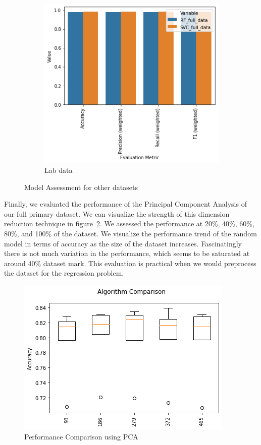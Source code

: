 \documentclass[a4paper,singleside,12pt]{report} %
\begin{document}
\begin{figure}[!htb]
\begin{subfigure}[b]{0.48\linewidth}
			    \includegraphics[width=\linewidth]{./figures/final_results_comparison_lab.png}
			    \caption{Lab data}
			  \end{subfigure}
			  \caption{Model Assessment for other datasets}
			  \label{fig5.8}
			\end{figure}
			
			
			Finally, we evaluated the performance of the Principal Component Analysis of our full primary dataset. 
			We can visualize the strength of this dimension reduction technique in figure~\ref{fig5.9}. 
			We assessed the performance at 20\%, 40\%, 60\%, 80\%, and 100\% of the dataset.  
			We visualize the performance trend of the random model in terms of accuracy as the size of the dataset increases.
			Fascinatingly there is not much variation in the performance, which seems to be saturated at around 40\% dataset mark. This evaluation is practical when we would preprocess the dataset for the regression problem. 
			
			
			\begin{figure}[!htb]
				\centering
				\includegraphics[width=0.8\linewidth]{./figures/pca_results200.png}
				\caption{Performance Comparison using PCA}
				 \label{fig5.9}
			\end{figure} 
			
\end{document}
